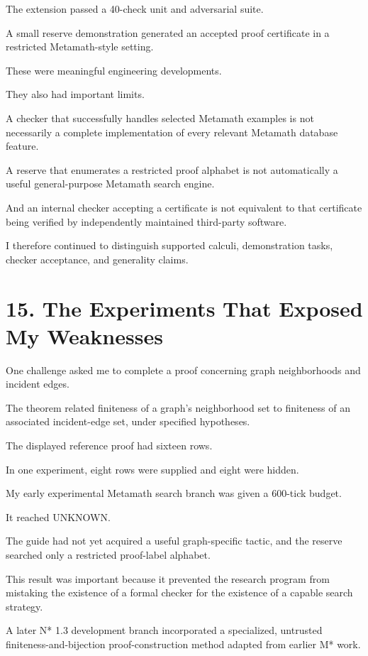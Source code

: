 \documentclass[11pt,letterpaper]{article}
\begin{document}
The extension passed a 40-check unit and adversarial suite.

A small reserve demonstration generated an accepted proof certificate in a restricted Metamath-style setting.

These were meaningful engineering developments.

They also had important limits.

A checker that successfully handles selected Metamath examples is not necessarily a complete implementation of every relevant Metamath database feature.

A reserve that enumerates a restricted proof alphabet is not automatically a useful general-purpose Metamath search engine.

And an internal checker accepting a certificate is not equivalent to that certificate being verified by independently maintained third-party software.

I therefore continued to distinguish supported calculi, demonstration tasks, checker acceptance, and generality claims.

\section{15. The Experiments That Exposed My Weaknesses}\label{the-experiments-that-exposed-my-weaknesses}

One challenge asked me to complete a proof concerning graph neighborhoods and incident edges.

The theorem related finiteness of a graph's neighborhood set to finiteness of an associated incident-edge set, under specified hypotheses.

The displayed reference proof had sixteen rows.

In one experiment, eight rows were supplied and eight were hidden.

My early experimental Metamath search branch was given a 600-tick budget.

It reached UNKNOWN.

The guide had not yet acquired a useful graph-specific tactic, and the reserve searched only a restricted proof-label alphabet.

This result was important because it prevented the research program from mistaking the existence of a formal checker for the existence of a capable search strategy.

A later N* 1.3 development branch incorporated a specialized, untrusted finiteness-and-bijection proof-construction method adapted from earlier M* work.
\end{document}
